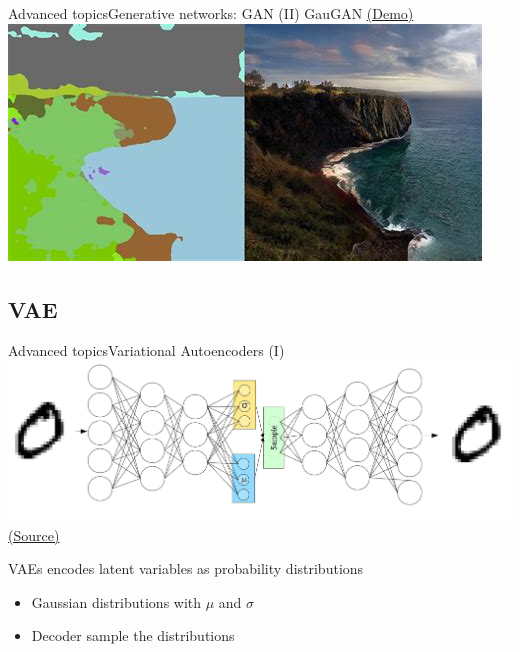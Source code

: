 \documentclass[10pt,compress]{beamer} %
\begin{document}
\begin{frame}{Advanced topics}{Generative networks: GAN (II)}
    \centering GauGAN \href{https://www.nvidia.com/en-us/studio/canvas/}{(Demo)}\\
	\includegraphics[width=0.9\linewidth]{figs/gaugan.jpeg}
\end{frame}

\subsection{VAE}
\begin{frame}{Advanced topics}{Variational Autoencoders (I)}
	\centering\includegraphics[width=0.85\linewidth]{figs/vae.png}\\
	\scriptsize\href{https://towardsdatascience.com/intuitively-understanding-variational-autoencoders-1bfe67eb5daf}{(Source)}

	\bigskip

	\flushleft
	\normalsize

	VAEs encodes latent variables as probability distributions
	\begin{itemize}
		\item Gaussian distributions with $\mu$ and $\sigma$
		\item Decoder sample the distributions
	\end{itemize}
\end{frame}
\end{document}
